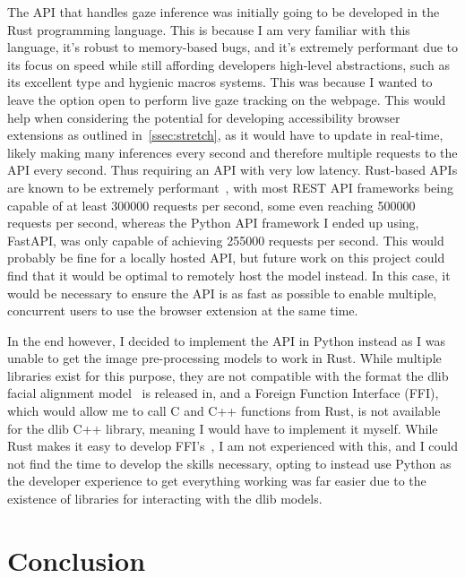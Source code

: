 \documentclass{report}
\begin{document}
The API that handles gaze inference was initially going to be developed in the Rust programming language. This is because I am very familiar with this language, it's robust to memory-based bugs, and it's extremely performant due to its focus on speed while still affording developers high-level abstractions, such as its excellent type and hygienic macros systems. This was because I wanted to leave the option open to perform live gaze tracking on the webpage. This would help when considering the potential for developing accessibility browser extensions as outlined in~\autoref{ssec:stretch}, as it would have to update in real-time, likely making many inferences every second and therefore multiple requests to the API every second. Thus requiring an API with very low latency. Rust-based APIs are known to be extremely performant~\cite{ali2020benchmark}, with most REST API frameworks being capable of at least 300000 requests per second, some even reaching 500000 requests per second, whereas the Python API framework I ended up using, FastAPI, was only capable of achieving 255000 requests per second. This would probably be fine for a locally hosted API, but future work on this project could find that it would be optimal to remotely host the model instead. In this case, it would be necessary to ensure the API is as fast as possible to enable multiple, concurrent users to use the browser extension at the same time. 

In the end however, I decided to implement the API in Python instead as I was unable to get the image pre-processing models to work in Rust. While multiple libraries exist for this purpose, they are not compatible with the format the dlib facial alignment model~\cite{king2009dlib} is released in, and a Foreign Function Interface (FFI), which would allow me to call C and C++ functions from Rust, is not available for the dlib C++ library, meaning I would have to implement it myself. While Rust makes it easy to develop FFI's~\cite{rust2017ffi}, I am not experienced with this, and I could not find the time to develop the skills necessary, opting to instead use Python as the developer experience to get everything working was far easier due to the existence of libraries for interacting with the dlib models.

\chapter{Conclusion}
\end{document}
